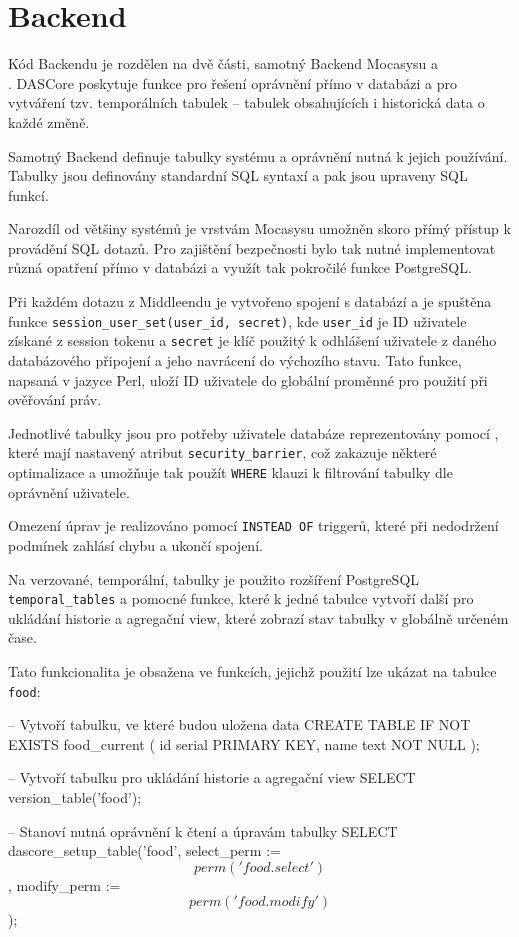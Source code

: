 \chapter{Backend} \label{backend}

Kód Backendu je rozdělen na dvě části, samotný Backend Mocasysu a
\\ . DASCore poskytuje funkce pro řešení oprávnění přímo v
databázi a pro vytváření tzv. temporálních tabulek -- tabulek obsahujících i
historická data o každé změně.

Samotný Backend definuje tabulky systému a oprávnění nutná k jejich používání.
Tabulky jsou definovány standardní SQL syntaxí a pak jsou upraveny SQL funkcí.

Narozdíl od většiny systémů je vrstvám Mocasysu umožněn skoro přímý přístup k 
provádění SQL dotazů. Pro zajištění bezpečnosti bylo tak nutné implementovat
různá opatření přímo v databázi a využít tak pokročilé funkce PostgreSQL.

Při každém dotazu z Middleendu je vytvořeno spojení s databází a je spuštěna
funkce \texttt{session\_user\_set(user\_id, secret)}, kde \texttt{user\_id} je ID
uživatele získané z session tokenu a \texttt{secret} je klíč použitý k odhlášení
uživatele z daného databázového připojení a jeho navrácení do výchozího stavu.
Tato funkce, napsaná v jazyce Perl, uloží ID uživatele do globální proměnné pro
použití při ověřování práv.

Jednotlivé tabulky jsou pro potřeby uživatele databáze reprezentovány pomocí
, které mají nastavený atribut \texttt{security\_barrier}, což zakazuje
některé optimalizace a umožňuje tak použít \texttt{WHERE} klauzi k filtrování
tabulky dle oprávnění uživatele.

Omezení úprav je realizováno pomocí \texttt{INSTEAD OF} triggerů, které při
nedodržení podmínek zahlásí chybu a ukončí spojení.

Na verzované, temporální, tabulky je použito rozšíření PostgreSQL
\texttt{temporal\-\_tables} \citep[viz][]{TemporalTables} a pomocné funkce, které
k jedné tabulce vytvoří další pro ukládání historie a agregační view, které
zobrazí stav tabulky v globálně určeném čase.

Tato funkcionalita je obsažena ve funkcích, jejichž použití lze ukázat na
tabulce \texttt{food}:

\begin{code}
-- Vytvoří tabulku, ve které budou uložena data
CREATE TABLE IF NOT EXISTS food_current (
    id serial PRIMARY KEY,
    name text NOT NULL
);

-- Vytvoří tabulku pro ukládání historie a agregační view
SELECT version_table('food');

-- Stanoví nutná oprávnění k čtení a úpravám tabulky
SELECT dascore_setup_table('food',
    select_perm := $$ perm('food.select') $$,
    modify_perm := $$ perm('food.modify') $$);
\end{code}

